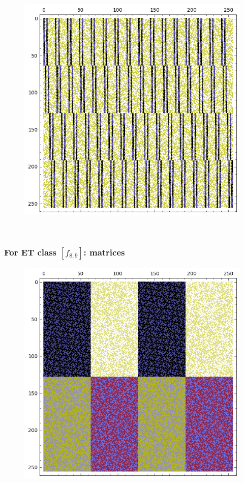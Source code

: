 \documentclass[pdf,sprung,slideColor,nocolorBG]{beamer}
\newenvironment{colortheme}[1]{
\def\ProvidesPackageRCS $##1${\relax}
\renewcommand{\ProcessOptions}{\relax}
\makeatletter

\makeatother
}{}
\begin{document}
\begin{colortheme}{jubata}
\begin{frame}
\begin{figure}
\begin{minipage}{.48\textwidth}
  \label{fig:8_8_weight_class_matrix}
\end{minipage}%
\begin{minipage}{.48\textwidth}
  \centering
  \includegraphics[width=.9\linewidth]{../matrix_plot/re8_8_bent_cayley_graph_index_matrix.png}
  \label{fig:8_8_bent_cayley_graph_index_matrix}
\end{minipage}
\end{figure}
~
\end{frame}
\begin{frame}
\frametitle{For ET class $[f_{8,9}]$: matrices}
\begin{figure}
\centering
\begin{minipage}{.48\textwidth}
  \centering
  \includegraphics[width=.9\linewidth]{../matrix_plot/re8_9_bent_cayley_graph_index_matrix.png}

\end{minipage}
\end{figure}
\end{frame}
\end{colortheme}
\end{document}
